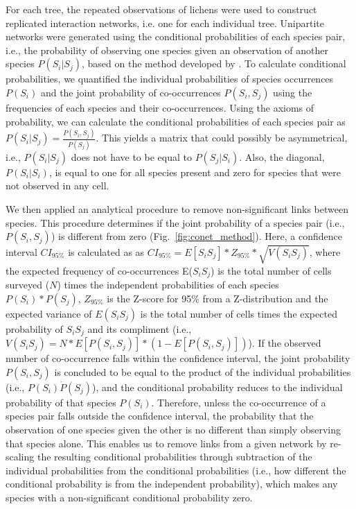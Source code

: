 \documentclass[fleqn,12pt]{olplainarticle}
\begin{document}
For each tree, the repeated observations of lichens were used to
construct replicated interaction networks, i.e. one for each
individual tree. Unipartite networks were generated using the
conditional probabilities of each species pair, i.e., the probability
of observing one species given an observation of another species
$P(S_i | S_j)$, based on the method developed by \cite{Araujo2011}. To
calculate conditional probabilities, we quantified the individual
probabilities of species occurrences $P(S_i)$ and the joint
probability of co-occurrences $P(S_i, S_j)$ using the frequencies of
each species and their co-occurrences. Using the axioms of
probability, we can calculate the conditional probabilities of each
species pair as $P(S_i|S_j) = \frac{P(S_i,S_j)}{P(S_j)}$. This yields
a matrix that could possibly be asymmetrical, i.e., $P(S_i|S_j)$ does
not have to be equal to $P(S_j|S_i)$. Also, the diagonal, $P(S_{i} |
S_{i})$, is equal to one for all species present and zero for species
that were not observed in any cell.

We then applied an analytical procedure to remove non-significant
links between species. This procedure determines if the joint
probability of a species pair (i.e., $P(S_i,S_j)$) is different from
zero (Fig.~\ref{fig:conet_method}).  Here, a confidence interval
$CI_{95\%}$ is calculated as as $CI_{95\%} = E[S_iS_j] * Z_{95\%} *
\sqrt{V(S_iS_j)}$, where the expected frequency of co-occurrences
E($S_iS_j$) is the total number of cells surveyed ($N$) times the
independent probabilities of each species $P(S_i) * P(S_j)$,
$Z_{95\%}$ is the Z-score for 95\% from a Z-distribution and the
expected variance of $E(S_iS_j)$ is the total number of cells times
the expected probability of $S_iS_j$ and its compliment (i.e.,
$V(S_iS_j) = N * E[P(S_i,S_j)] * (1 - E[P(S_i,S_j)])$). If the
observed number of co-occurrence falls within the confidence interval,
the joint probability $P(S_i,S_j)$ is concluded to be equal to the
product of the individual probabilities (i.e., $P(S_i) \dot P(S_j)$),
and the conditional probability reduces to the individual probability
of that species $P(S_i)$. Therefore, unless the co-occurrence of a
species pair falls outside the confidence interval, the probability
that the observation of one species given the other is no different
than simply observing that species alone. This enables us to remove
links from a given network by re-scaling the resulting conditional
probabilities through subtraction of the individual probabilities from
the conditional probabilities (i.e., how different the conditional
probability is from the independent probability), which makes any
species with a non-significant conditional probability zero.
\end{document}
